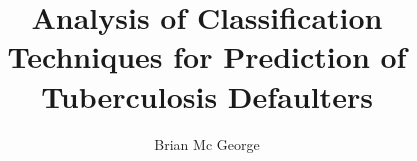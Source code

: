 \documentclass{sig-alternate-05-2015}
\begin{document}
	
	
	
	
	
	
	
	
	\title{Analysis of Classification Techniques for Prediction of Tuberculosis Defaulters}
	
	\author{
		\alignauthor
		Brian Mc George\\
		\\
		\\
	}
	
\end{document}
